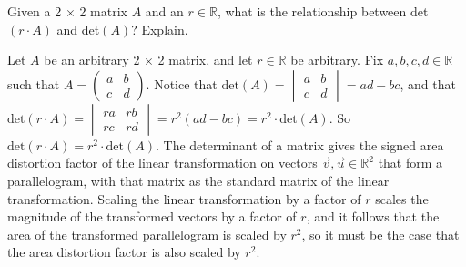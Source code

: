 \documentclass[12pt]{article}
\newenvironment{problem}[2][Problem]
{
	\begin{trivlist} 
		\item[\hskip \labelsep {\bfseries #1 #2:}]
	}
{
	\end{trivlist}
	}
\newenvironment{solution}[1][Solution]
{
	\begin{trivlist} 
		\item[\hskip \labelsep {\itshape #1:}]
	}
	{
	\end{trivlist}
}
\begin{document}
\newpage
\begin{problem}{6}
Given a 2 $\times$ 2 matrix $A$ and an $r\in \mathbb{R}$, what is the relationship between det$(r\cdot A)$ and det$(A)$? Explain.
\noindent
\newline
\newline
\begin{solution}
Let $A$ be an arbitrary 2 $\times$ 2 matrix, and let $r\in\mathbb{R}$ be arbitrary. Fix $a,b,c,d\in\mathbb{R}$ such that $A=\begin{pmatrix}a&b\\c&d\end{pmatrix}$. Notice that $\text{det}(A) = \begin{vmatrix}a&b\\c&d\end{vmatrix} = ad-bc$, and that $\text{det}(r\cdot A) = \begin{vmatrix} ra&rb\\rc&rd\end{vmatrix} = r^2 (ad-bc) = r^2 \cdot \text{det}(A)$. So $\text{det}(r\cdot A) = r^2 \cdot \text{det}(A)$. The determinant of a matrix gives the signed area distortion factor of the linear transformation on vectors $\vec{v},\vec{u}\in\mathbb{R}^2$ that form a parallelogram, with that matrix as the standard matrix of the linear transformation. Scaling the linear transformation by a factor of $r$ scales the magnitude of the transformed vectors by a factor of $r$, and it follows that the area of the transformed parallelogram is scaled by $r^2$, so it must be the case that the area distortion factor is also scaled by $r^2$.
\end{solution}
\end{problem}
\end{document}

